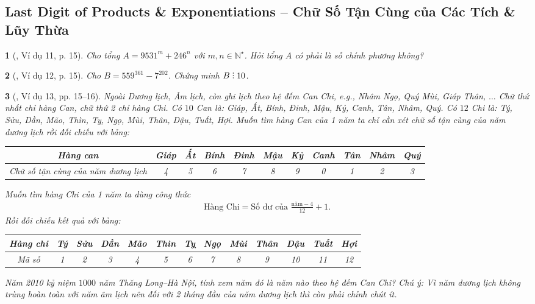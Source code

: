 \documentclass{article}
\newtheorem{baitoan}{}
\DeclareRobustCommand{\divby}{%
	\mathrel{\vbox{\baselineskip.65ex\lineskiplimit0pt\hbox{.}\hbox{.}\hbox{.}}}%
}
\begin{document}

\subsection{Last Digit of Products \& Exponentiations -- Chữ Số Tận Cùng của Các Tích \& Lũy Thừa}

\begin{baitoan}[\cite{Tuyen_Toan_6}, Ví dụ 11, p. 15]
	Cho tổng $A = 9531^m + 246^n$ với $m,n\in\mathbb{N}^\star$. Hỏi tổng $A$ có phải là số chính phương không?
\end{baitoan}

\begin{baitoan}[\cite{Tuyen_Toan_6}, Ví dụ 12, p. 15]
	Cho $B = 559^{361} - 7^{202}$. Chứng minh $B\divby10$.
\end{baitoan}

\begin{baitoan}[\cite{Tuyen_Toan_6}, Ví dụ 13, pp. 15--16]
	Ngoài Dương lịch, Âm lịch, còn ghi lịch theo hệ đếm Can Chi, e.g., Nhâm Ngọ, Quý Mùi, Giáp Thân, $\ldots$ Chữ thứ nhất chỉ hàng Can, chữ thứ 2 chỉ hàng Chi. Có $10$ Can là: Giáp, Ất, Bính, Đinh, Mậu, Kỷ, Canh, Tân, Nhâm, Quý. Có $12$ Chi là: Tý, Sửu, Dần, Mão, Thìn, Tỵ, Ngọ, Mùi, Thân, Dậu, Tuất, Hợi. Muốn tìm hàng Can của 1 năm ta chỉ cần xét chữ số tận cùng của năm dương lịch rồi đối chiếu với bảng:
	\begin{table}[H]
		\centering
		\begin{tabular}{|c|c|c|c|c|c|c|c|c|c|c|}
			\hline
			Hàng can & Giáp & Ất & Bính & Đinh & Mậu & Kỷ & Canh & Tân & Nhâm & Quý \\
			\hline
			Chữ số tận cùng của năm dương lịch & 4 & 5 & 6 & 7 & 8 & 9 & 0 & 1 & 2 & 3 \\
			\hline
		\end{tabular}
	\end{table}
	Muốn tìm hàng Chi của 1 năm ta dùng công thức
	\begin{align*}
		\mbox{Hàng Chi} = \mbox{Số dư của }\frac{\mbox{năm} - 4}{12} + 1.
	\end{align*}
	Rồi đối chiếu kết quả với bảng:
	\begin{table}[H]
		\centering
		\begin{tabular}{|c|c|c|c|c|c|c|c|c|c|c|c|c|}
			\hline
			Hàng chi & Tý & Sửu & Dần & Mão & Thìn & Tỵ & Ngọ & Mùi & Thân & Dậu & Tuất & Hợi \\
			\hline
			Mã số & 1 & 2 & 3 & 4 & 5 & 6 & 7 & 8 & 9 & 10 & 11 & 12 \\
			\hline
		\end{tabular}
	\end{table}
	Năm 2010 kỷ niệm $1000$ năm Thăng Long--Hà Nội, tính xem năm đó là năm nào theo hệ đếm Can Chi? Chú ý: Vì năm dương lịch không trùng hoàn toàn với năm âm lịch nên đối với 2 tháng đầu của năm dương lịch thì còn phải chỉnh chút ít.
\end{baitoan}
\end{document}
